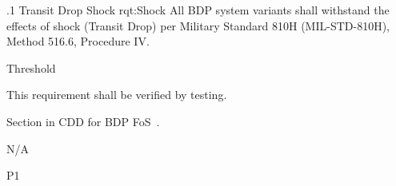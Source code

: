 

\ONERQMTVKSA
{\RqtNumberBase.1}
{Transit Drop Shock}
{rqt:Shock}
{All BDP system variants shall withstand the effects of shock (Transit Drop) per Military Standard 810H (MIL-STD-810H), Method 516.6, Procedure IV.}
{
	\item [Phase 1] Threshold
}
{This requirement shall be verified by testing.}
{
\item [6.1] Section in CDD for BDP FoS~\cite{ref__BDP_FOS_CDD}.
}
{
	\item N/A
}
{P1}

